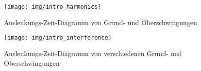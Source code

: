 \begin{frame}
  \begin{figure}
    \centering
    \texttt{[image: img/intro\_harmonics]}
    \caption{Auslenkungs-Zeit-Diagramm von Grund- und Oberschwingungen}
    \label{img:harmonics}
  \end{figure}
\end{frame}

\begin{frame}
  \begin{figure}
    \centering
    \texttt{[image: img/intro\_interference]}
    \caption{Auslenkungs-Zeit-Diagramm von verschiedenen Grund- und Oberschwingungen}
    \label{img:interference}
  \end{figure}
\end{frame}

